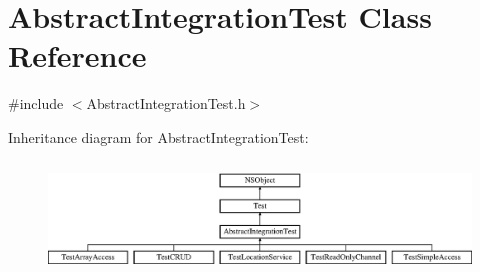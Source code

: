 \hypertarget{interface_abstract_integration_test}{
\section{\-Abstract\-Integration\-Test \-Class \-Reference}
\label{interface_abstract_integration_test}
}


{\ttfamily \#include $<$\-Abstract\-Integration\-Test.\-h$>$}

\-Inheritance diagram for \-Abstract\-Integration\-Test\-:\begin{figure}[H]
\begin{center}
\leavevmode
\includegraphics[height=3.006711cm]{interface_abstract_integration_test}
\end{center}
\end{figure}
